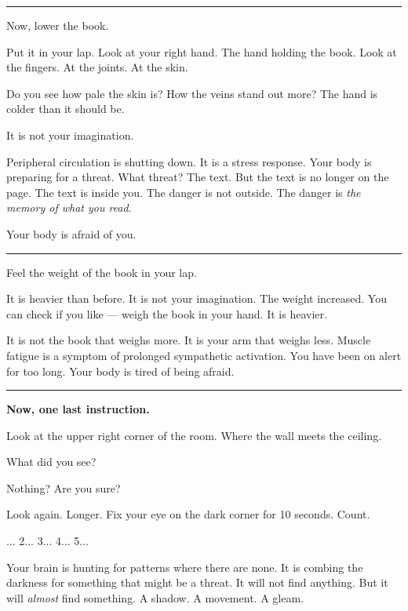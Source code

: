 \vspace{0.5em}\noindent\rule{\textwidth}{0.5pt}\vspace{0.5em}

\noindent Now, lower the book.

\noindent Put it in your lap. Look at your right hand. The hand holding the book. Look at the fingers. At the joints. At the skin.

\noindent Do you see how pale the skin is? How the veins stand out more? The hand is colder than it should be.

\noindent It is not your imagination.

\noindent Peripheral circulation is shutting down. It is a stress response. Your body is preparing for a threat. What threat? The text. But the text is no longer on the page. The text is inside you. The danger is not outside. The danger is \textit{the memory of what you read}.

\noindent Your body is afraid of you.

\vspace{0.5em}\noindent\rule{\textwidth}{0.5pt}\vspace{0.5em}

\noindent Feel the weight of the book in your lap.

\noindent It is heavier than before. It is not your imagination. The weight increased. You can check if you like --- weigh the book in your hand. It is heavier.

\noindent It is not the book that weighs more.
It is your arm that weighs less.
Muscle fatigue is a symptom of prolonged sympathetic activation.
You have been on alert for too long.
Your body is tired of being afraid.

\vspace{0.5em}\noindent\rule{\textwidth}{0.5pt}\vspace{0.5em}

\noindent \textbf{Now, one last instruction.}

\noindent Look at the upper right corner of the room. Where the wall meets the ceiling.

\noindent What did you see?

\noindent Nothing? Are you sure?

\noindent Look again. Longer. Fix your eye on the dark corner for 10 seconds. Count.

... 2... 3... 4... 5...

\noindent Your brain is hunting for patterns where there are none. It is combing the darkness for something that might be a threat. It will not find anything. But it will \textit{almost} find something. A shadow. A movement. A gleam.

